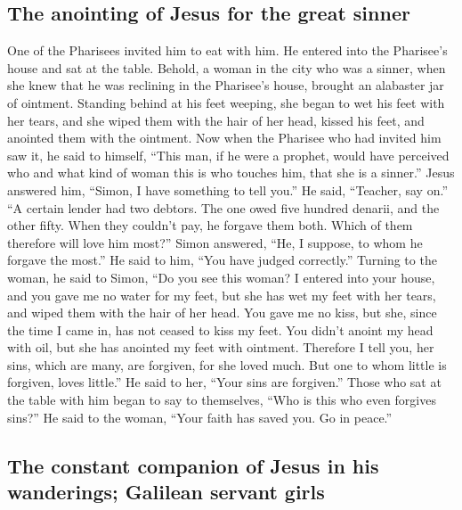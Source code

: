 \hypertarget{the-anointing-of-jesus-for-the-great-sinner}{%
\subsection{The anointing of Jesus for the great
sinner}\label{the-anointing-of-jesus-for-the-great-sinner}}

 One of the Pharisees invited him to eat with him. He
entered into the Pharisee's house and sat at the table. 
Behold, a woman in the city who was a sinner, when she knew that he was
reclining in the Pharisee's house, brought an alabaster jar of ointment.
 Standing behind at his feet weeping, she began to wet
his feet with her tears, and she wiped them with the hair of her head,
kissed his feet, and anointed them with the ointment. 
Now when the Pharisee who had invited him saw it, he said to himself,
``This man, if he were a prophet, would have perceived who and what kind
of woman this is who touches him, that she is a sinner.''
 Jesus answered him, ``Simon, I have something to tell
you.'' He said, ``Teacher, say on.''  ``A certain lender
had two debtors. The one owed five hundred denarii, and the other fifty.
 When they couldn't pay, he forgave them both. Which of
them therefore will love him most?''  Simon answered,
``He, I suppose, to whom he forgave the most.'' He said to him, ``You
have judged correctly.''  Turning to the woman, he said
to Simon, ``Do you see this woman? I entered into your house, and you
gave me no water for my feet, but she has wet my feet with her tears,
and wiped them with the hair of her head.  You gave me no
kiss, but she, since the time I came in, has not ceased to kiss my feet.
 You didn't anoint my head with oil, but she has anointed
my feet with ointment.  Therefore I tell you, her sins,
which are many, are forgiven, for she loved much. But one to whom little
is forgiven, loves little.''  He said to her, ``Your sins
are forgiven.''  Those who sat at the table with him
began to say to themselves, ``Who is this who even forgives sins?''
 He said to the woman, ``Your faith has saved you. Go in
peace.''

\hypertarget{the-constant-companion-of-jesus-in-his-wanderings-galilean-servant-girls}{%
\subsection{The constant companion of Jesus in his wanderings; Galilean
servant
girls}\label{the-constant-companion-of-jesus-in-his-wanderings-galilean-servant-girls}}

